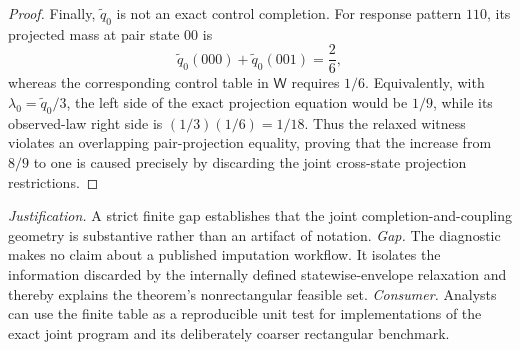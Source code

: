 \documentclass{article}
\begin{document}
\begin{proof}
Finally, \(\widetilde q_0\) is not an exact control completion.  For response pattern \(110\), its projected mass at pair state \(00\) is
\[
\widetilde q_0(000)+\widetilde q_0(001)=\frac{2}{6},
\]
whereas the corresponding control table in \(\mathsf W\) requires \(1/6\).  Equivalently, with \(\lambda_0=\widetilde q_0/3\), the left side of the exact projection equation would be \(1/9\), while its observed-law right side is \((1/3)(1/6)=1/18\).  Thus the relaxed witness violates an overlapping pair-projection equality, proving that the increase from \(8/9\) to one is caused precisely by discarding the joint cross-state projection restrictions.
\end{proof}
\par\smallskip\noindent \textit{Justification.} A strict finite gap establishes that the joint completion-and-coupling geometry is substantive rather than an artifact of notation. \textit{Gap.} The diagnostic makes no claim about a published imputation workflow. It isolates the information discarded by the internally defined statewise-envelope relaxation and thereby explains the theorem's nonrectangular feasible set. \textit{Consumer.} Analysts can use the finite table as a reproducible unit test for implementations of the exact joint program and its deliberately coarser rectangular benchmark.
\end{document}
